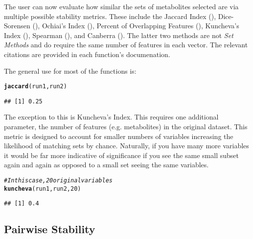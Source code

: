 \documentclass[12pt]{article}\usepackage[]{graphicx}\usepackage[usenames,dvipsnames]{color}
\makeatletter
\newcommand{\hlnum}[1]{\textcolor[rgb]{0.686,0.059,0.569}{#1}}%
\newcommand{\hlcom}[1]{\textcolor[rgb]{0.678,0.584,0.686}{\textit{#1}}}%
\newcommand{\hlstd}[1]{\textcolor[rgb]{0.345,0.345,0.345}{#1}}%
\newcommand{\hlkwd}[1]{\textcolor[rgb]{0.737,0.353,0.396}{\textbf{#1}}}%
\newenvironment{kframe}{%
 \def\at@end@of@kframe{}%
 \ifinner\ifhmode%
  \def\at@end@of@kframe{\end{minipage}}%
  \begin{minipage}{\columnwidth}%
 \fi\fi%
 \def\FrameCommand##1{\hskip\@totalleftmargin \hskip-\fboxsep
 \colorbox{shadecolor}{##1}\hskip-\fboxsep
     \hskip-\linewidth \hskip-\@totalleftmargin \hskip\columnwidth}%
 \MakeFramed {\advance\hsize-\width
   \@totalleftmargin\z@ \linewidth\hsize
   \@setminipage}}%
 {\par\unskip\endMakeFramed%
 \at@end@of@kframe}
\newenvironment{knitrout}{}{} %
\makeatother
\begin{document}
The user can now evaluate how similar the sets of metabolites selected are via
multiple possible stability metrics.  These include the Jaccard Index 
(), Dice-Sorensen (), Ochiai's Index 
(), Percent of Overlapping Features (), 
Kuncheva's Index (), Spearman (), and
Canberra ().  The latter two methods are not 
\emph{Set Methods} and do require the same number of features in each vector.
The relevant citations are provided in each function's documenation.

The general use for most of the functions is:

\begin{knitrout}
\color{fgcolor}\begin{kframe}
\begin{alltt}
\hlkwd{jaccard}\hlstd{(run1, run2)}
\end{alltt}
\begin{verbatim}
## [1] 0.25
\end{verbatim}
\end{kframe}
\end{knitrout}

The exception to this is Kuncheva's Index.  This requires one additional
parameter, the number of features (e.g. metabolites) in the original dataset.
This metric is designed to account for smaller numbers of variables increasing
the likelihood of matching sets by chance.  Naturally, if you have many more
variables it would be far more indicative of significance if you see the same
small subset again and again as opposed to a small set seeing the same 
variables.

\begin{knitrout}
\color{fgcolor}\begin{kframe}
\begin{alltt}
\hlcom{# In this case, 20 original variables}
\hlkwd{kuncheva}\hlstd{(run1, run2,} \hlnum{20}\hlstd{)}
\end{alltt}
\begin{verbatim}
## [1] 0.4
\end{verbatim}
\end{kframe}
\end{knitrout}

\newpage
\subsection{Pairwise Stability}
\end{document}
